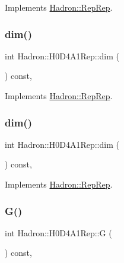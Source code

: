 Implements \mbox{\hyperlink{structHadron_1_1RepRep_a92c8802e5ed7afd7da43ccfd5b7cd92b}{Hadron\+::\+Rep\+Rep}}.

\mbox{\label{structHadron_1_1H0D4A1Rep_ac5a45aa7f7cdc3ab70b8c164b2e1dce0}} 
\subsubsection{\texorpdfstring{dim()}{dim()}\hspace{0.1cm}{\footnotesize\ttfamily [2/3]}}
{\footnotesize\ttfamily int Hadron\+::\+H0\+D4\+A1\+Rep\+::dim (\begin{DoxyParamCaption}{ }\end{DoxyParamCaption}) const\hspace{0.3cm}{\ttfamily [inline]}, {\ttfamily [virtual]}}



Implements \mbox{\hyperlink{structHadron_1_1RepRep_a92c8802e5ed7afd7da43ccfd5b7cd92b}{Hadron\+::\+Rep\+Rep}}.

\mbox{\label{structHadron_1_1H0D4A1Rep_ac5a45aa7f7cdc3ab70b8c164b2e1dce0}} 
\subsubsection{\texorpdfstring{dim()}{dim()}\hspace{0.1cm}{\footnotesize\ttfamily [3/3]}}
{\footnotesize\ttfamily int Hadron\+::\+H0\+D4\+A1\+Rep\+::dim (\begin{DoxyParamCaption}{ }\end{DoxyParamCaption}) const\hspace{0.3cm}{\ttfamily [inline]}, {\ttfamily [virtual]}}



Implements \mbox{\hyperlink{structHadron_1_1RepRep_a92c8802e5ed7afd7da43ccfd5b7cd92b}{Hadron\+::\+Rep\+Rep}}.

\mbox{\label{structHadron_1_1H0D4A1Rep_ab13ff026da1bc59df4b52835038296d5}} 
\subsubsection{\texorpdfstring{G()}{G()}\hspace{0.1cm}{\footnotesize\ttfamily [1/2]}}
{\footnotesize\ttfamily int Hadron\+::\+H0\+D4\+A1\+Rep\+::G (\begin{DoxyParamCaption}{ }\end{DoxyParamCaption}) const\hspace{0.3cm}{\ttfamily [inline]}, {\ttfamily [virtual]}}

